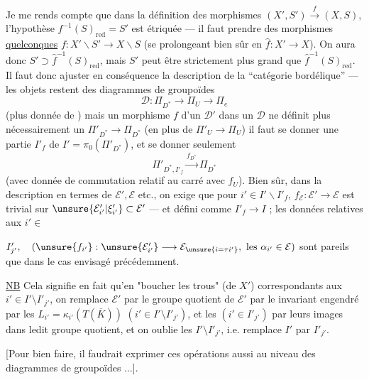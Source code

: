 Je me rends compte que dans la définition des morphismes $(X',S')\xrightarrow{f}(X,S)$, l'hypothèse $f^{-1}(S)_{\mathrm{red}}=S'$ est étriquée --- il faut prendre des morphismes \uline{quelconques} $f:X'\backslash S'\to X\backslash S$ (se prolongeant bien sûr en $\widehat{f}:X'\to X$).
On aura donc $S'\supset\widehat{f}^{-1}(S)_{\mathrm{red}}$, mais $S'$ peut être strictement plus grand que $\widehat{f}^{-1}(S)_{\mathrm{red}}$.
Il faut donc ajuster en conséquence la description de la ``catégorie bordélique'' --- les objets restent des diagrammes de groupoïdes
\[
\mathcal{D}:\Pi_{D^*}\to\Pi_U\to\Pi_e
\]
(plus donnée de ) mais un morphisme $f$ d'un $\mathcal{D}'$ dans un $\mathcal{D}$ ne définit plus nécessairement un $\Pi'_{D^*}\to\Pi_{D^*}$ (en plus de $\Pi'_U\to\Pi_U$) il faut se donner une partie $I'_f$ de $I'=\pi_0(\Pi'_{D^*})$, et se donner seulement
\[
\Pi'_{D^*,I'_f}\xrightarrow{f_{D^*}}\Pi_{D^*}
\]
(avec donnée de commutation  relatif au carré avec $f_U$).
Bien sûr, dans la description en termes de $\mathcal{E}',\mathcal{E}$ etc., on exige que pour $i'\in I'\backslash I'_f$, $f_{\mathcal{E}}:\mathcal{E}'\to\mathcal{E}$ est trivial sur $\unsure{\mathcal{E}'_{i'}|\xi'_{i'}}\subset\mathcal{E}'$ --- et  défini comme $I'_f\to I$ ; les données relatives aux $i'\in$


\(I'_{j'},\quad (\unsure{f_{i'}}:\unsure{\mathcal E'_{i'}}\longrightarrow
\mathcal E_{\unsure{i=\tau i'}},\ \text{les }\alpha_{i'}\in\mathcal E)\)
sont pareils que dans le cas envisagé précédemment.

\uline{NB} Cela signifie en fait qu'en  "boucher les trous" 
(de \(X'\)) correspondants aux \(i'\in I'\setminus I'_{j'}\), on remplace
\(\mathcal E'\) par le  groupe quotient de \(\mathcal E'\)
par le  invariant engendré par les
\(L_{i'}=\kappa_{i'}(T(\overline K))\)
\((i'\in I'\setminus I'_{j'})\), et les 
\((i'\in I'_{j'})\) par leurs images dans ledit groupe quotient, et on oublie
les \(I'\setminus I'_{j'}\), i.e. remplace \(I'\) par \(I'_{j'}\).

[Pour bien faire, il faudrait exprimer ces opérations aussi au niveau des diagrammes
de groupoïdes
\(\ldots\)].

